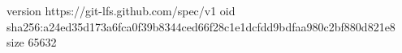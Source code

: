 version https://git-lfs.github.com/spec/v1
oid sha256:a24ed35d173a6fca0f39b8344ced66f28c1e1dcfdd9bdfaa980c2bf880d821e8
size 65632
